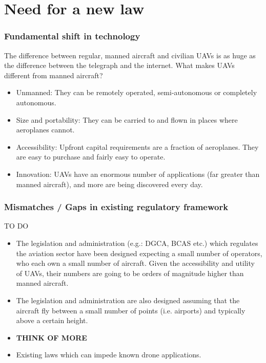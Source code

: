 \documentclass[10pt]{beamer}
\begin{document}
\section{Need for a new law}

\begin{frame}
  \frametitle{Fundamental shift in technology}
The difference between regular, manned aircraft and civilian UAVs is as
    huge as the difference between the telegraph and the internet. What makes UAVs different from manned aircraft?
  \begin{itemize}
  \item Unmanned: They can be remotely operated, semi-autonomous or completely autonomous.
  \item Size and portability: They can be carried to and flown in places where aeroplanes cannot. 
  \item Accessibility: Upfront capital requirements are a fraction of aeroplanes. They are easy to purchase and fairly easy to operate.
  \item Innovation: UAVs have an enormous number of applications (far greater than manned aircraft), and more are being discovered every day.
  \end{itemize}
\end{frame}

\begin{frame}
  \frametitle{Mismatches / Gaps in existing regulatory framework}
  TO DO
  \begin{itemize}
  \item The legislation and administration (e.g.: DGCA, BCAS etc.) which regulates the aviation sector have been designed expecting a small number of operators, who each own a small number of aircraft. Given the accessibility and utility of UAVs, their numbers are going to be orders of magnitude higher than manned aircraft.
  \item The legislation and administration are also designed assuming that the aircraft fly between a small number of points (i.e. airports) and typically above a certain height.
  \item \textbf{THINK OF MORE}
  \item Existing laws which can impede known drone applications.
  \end{itemize}
\end{frame}
\end{document}
